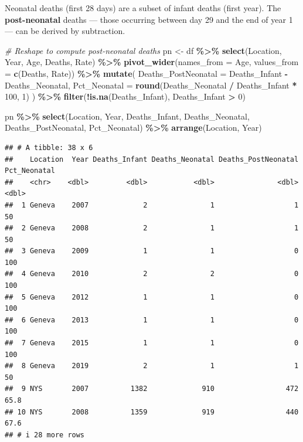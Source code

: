 \documentclass[
]{article}
\newenvironment{Shaded}{\begin{snugshade}}{\end{snugshade}}
\newcommand{\AttributeTok}[1]{\textcolor[rgb]{0.13,0.29,0.53}{#1}}
\newcommand{\CommentTok}[1]{\textcolor[rgb]{0.56,0.35,0.01}{\textit{#1}}}
\newcommand{\DecValTok}[1]{\textcolor[rgb]{0.00,0.00,0.81}{#1}}
\newcommand{\FunctionTok}[1]{\textcolor[rgb]{0.13,0.29,0.53}{\textbf{#1}}}
\newcommand{\NormalTok}[1]{#1}
\newcommand{\OtherTok}[1]{\textcolor[rgb]{0.56,0.35,0.01}{#1}}
\newcommand{\SpecialCharTok}[1]{\textcolor[rgb]{0.81,0.36,0.00}{\textbf{#1}}}
\begin{document}
Neonatal deaths (first 28 days) are a subset of infant deaths (first
year). The \textbf{post-neonatal} deaths --- those occurring between day
29 and the end of year 1 --- can be derived by subtraction.

\begin{Shaded}
\begin{Highlighting}[]
\CommentTok{\# Reshape to compute post{-}neonatal deaths}
\NormalTok{pn }\OtherTok{\textless{}{-}}\NormalTok{ df }\SpecialCharTok{\%\textgreater{}\%}
  \FunctionTok{select}\NormalTok{(Location, Year, Age, Deaths, Rate) }\SpecialCharTok{\%\textgreater{}\%}
  \FunctionTok{pivot\_wider}\NormalTok{(}\AttributeTok{names\_from =}\NormalTok{ Age, }\AttributeTok{values\_from =} \FunctionTok{c}\NormalTok{(Deaths, Rate)) }\SpecialCharTok{\%\textgreater{}\%}
  \FunctionTok{mutate}\NormalTok{(}
    \AttributeTok{Deaths\_PostNeonatal =}\NormalTok{ Deaths\_Infant }\SpecialCharTok{{-}}\NormalTok{ Deaths\_Neonatal,}
    \AttributeTok{Pct\_Neonatal        =} \FunctionTok{round}\NormalTok{(Deaths\_Neonatal }\SpecialCharTok{/}\NormalTok{ Deaths\_Infant }\SpecialCharTok{*} \DecValTok{100}\NormalTok{, }\DecValTok{1}\NormalTok{)}
\NormalTok{  ) }\SpecialCharTok{\%\textgreater{}\%}
  \FunctionTok{filter}\NormalTok{(}\SpecialCharTok{!}\FunctionTok{is.na}\NormalTok{(Deaths\_Infant), Deaths\_Infant }\SpecialCharTok{\textgreater{}} \DecValTok{0}\NormalTok{)}

\NormalTok{pn }\SpecialCharTok{\%\textgreater{}\%}
  \FunctionTok{select}\NormalTok{(Location, Year, Deaths\_Infant, Deaths\_Neonatal, Deaths\_PostNeonatal, Pct\_Neonatal) }\SpecialCharTok{\%\textgreater{}\%}
  \FunctionTok{arrange}\NormalTok{(Location, Year)}
\end{Highlighting}
\end{Shaded}

\begin{verbatim}
## # A tibble: 38 x 6
##    Location  Year Deaths_Infant Deaths_Neonatal Deaths_PostNeonatal Pct_Neonatal
##    <chr>    <dbl>         <dbl>           <dbl>               <dbl>        <dbl>
##  1 Geneva    2007             2               1                   1         50  
##  2 Geneva    2008             2               1                   1         50  
##  3 Geneva    2009             1               1                   0        100  
##  4 Geneva    2010             2               2                   0        100  
##  5 Geneva    2012             1               1                   0        100  
##  6 Geneva    2013             1               1                   0        100  
##  7 Geneva    2015             1               1                   0        100  
##  8 Geneva    2019             2               1                   1         50  
##  9 NYS       2007          1382             910                 472         65.8
## 10 NYS       2008          1359             919                 440         67.6
## # i 28 more rows
\end{verbatim}
\end{document}
